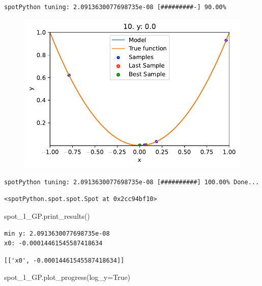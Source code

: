 \documentclass[
  letterpaper,
  DIV=11,
  numbers=noendperiod]{scrreprt}
\newenvironment{Shaded}{\begin{snugshade}}{\end{snugshade}}
\newcommand{\NormalTok}[1]{\textcolor[rgb]{0.00,0.23,0.31}{#1}}
\newcommand{\OperatorTok}[1]{\textcolor[rgb]{0.37,0.37,0.37}{#1}}
\newcommand{\VariableTok}[1]{\textcolor[rgb]{0.07,0.07,0.07}{#1}}
\begin{document}
\begin{verbatim}
spotPython tuning: 2.0913630077698735e-08 [#########-] 90.00% 
\end{verbatim}

\begin{figure}[H]

{\centering \includegraphics{010_num_spot_sklearn_surrogate_files/figure-pdf/cell-25-output-14.pdf}

}

\end{figure}

\begin{verbatim}
spotPython tuning: 2.0913630077698735e-08 [##########] 100.00% Done...
\end{verbatim}

\begin{verbatim}
<spotPython.spot.spot.Spot at 0x2cc94bf10>
\end{verbatim}

\begin{Shaded}
\begin{Highlighting}[]
\NormalTok{spot\_1\_GP.print\_results()}
\end{Highlighting}
\end{Shaded}

\begin{verbatim}
min y: 2.0913630077698735e-08
x0: -0.00014461545587418634
\end{verbatim}

\begin{verbatim}
[['x0', -0.00014461545587418634]]
\end{verbatim}

\begin{Shaded}
\begin{Highlighting}[]
\NormalTok{spot\_1\_GP.plot\_progress(log\_y}\OperatorTok{=}\VariableTok{True}\NormalTok{)}
\end{Highlighting}
\end{Shaded}
\end{document}
